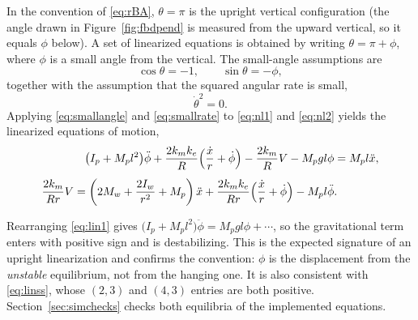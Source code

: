 In the convention of \eqref{eq:rBA}, $\theta=\pi$ is the upright
vertical configuration (the angle drawn in Figure~\ref{fig:fbdpend} is measured
from the upward vertical, so it equals $\phi$ below). A set of linearized equations is obtained by writing
$\theta=\pi+\phi$, where $\phi$ is a small angle from the vertical. The
small-angle assumptions are
\begin{equation}\label{eq:smallangle}
\cos\theta=-1,\qquad \sin\theta=-\phi,
\end{equation}
together with the assumption that the squared angular rate is small,
\begin{equation}\label{eq:smallrate}
\dot\theta^2=0 .
\end{equation}
Applying \eqref{eq:smallangle} and \eqref{eq:smallrate} to \eqref{eq:nl1} and
\eqref{eq:nl2} yields the linearized equations of motion,
\begin{align}
\bigl(I_p+M_pl^2\bigr)\ddot\phi+\frac{2k_mk_e}{R}\Bigl(\frac{\dot x}{r}+\dot\phi\Bigr)
-\frac{2k_m}{R}V-M_pgl\phi&=M_pl\ddot x ,\label{eq:lin1}\\[4pt]
\frac{2k_m}{Rr}V=\left(2M_w+\frac{2I_w}{r^2}+M_p\right)\ddot x
+\frac{2k_mk_e}{Rr}\Bigl(\frac{\dot x}{r}+\dot\phi\Bigr)-M_pl\ddot\phi&. \label{eq:lin2}
\end{align}

\begin{remark}\label{rem:gravsign}
Rearranging \eqref{eq:lin1} gives
$\bigl(I_p+M_pl^2\bigr)\ddot\phi=M_pgl\phi+\cdots$, so the gravitational term
enters with positive sign and is destabilizing. This is the expected signature
of an upright linearization and confirms the convention: $\phi$ is the
displacement from the \emph{unstable} equilibrium, not from the hanging one. It
is also consistent with \eqref{eq:linss}, whose $(2,3)$ and $(4,3)$ entries are
both positive. Section~\ref{sec:simchecks} checks both equilibria of the
implemented equations.
\end{remark}

